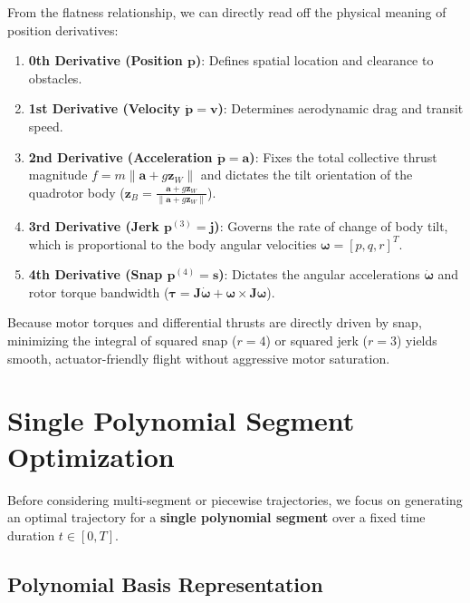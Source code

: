\documentclass[11pt,a4paper]{article}
\begin{document}
\begin{dronebox}
From the flatness relationship, we can directly read off the physical meaning of position derivatives:
\begin{enumerate}
    \item \textbf{0th Derivative (Position $\mathbf{p}$)}: Defines spatial location and clearance to obstacles.
    \item \textbf{1st Derivative (Velocity $\dot{\mathbf{p}} = \mathbf{v}$)}: Determines aerodynamic drag and transit speed.
    \item \textbf{2nd Derivative (Acceleration $\ddot{\mathbf{p}} = \mathbf{a}$)}: Fixes the total collective thrust magnitude $f = m \|\mathbf{a} + g \mathbf{z}_W\|$ and dictates the tilt orientation of the quadrotor body ($\mathbf{z}_B = \frac{\mathbf{a} + g\mathbf{z}_W}{\|\mathbf{a} + g\mathbf{z}_W\|}$).
    \item \textbf{3rd Derivative (Jerk $\mathbf{p}^{(3)} = \mathbf{j}$)}: Governs the rate of change of body tilt, which is proportional to the body angular velocities $\boldsymbol{\omega} = [p, q, r]^T$.
    \item \textbf{4th Derivative (Snap $\mathbf{p}^{(4)} = \mathbf{s}$)}: Dictates the angular accelerations $\dot{\boldsymbol{\omega}}$ and rotor torque bandwidth ($\boldsymbol{\tau} = \mathbf{J}\dot{\boldsymbol{\omega}} + \boldsymbol{\omega} \times \mathbf{J}\boldsymbol{\omega}$).
\end{enumerate}
\end{dronebox}

Because motor torques and differential thrusts are directly driven by snap, minimizing the integral of squared snap ($r=4$) or squared jerk ($r=3$) yields smooth, actuator-friendly flight without aggressive motor saturation.

\section{Single Polynomial Segment Optimization}

Before considering multi-segment or piecewise trajectories, we focus on generating an optimal trajectory for a \textbf{single polynomial segment} over a fixed time duration $t \in [0, T]$.

\subsection{Polynomial Basis Representation}
\end{document}
